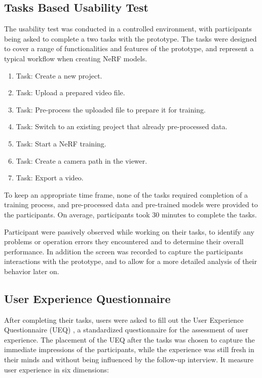 \subsection*{Tasks Based Usability Test}
\label{sec:methodology:study:tasks}

The usability test was conducted in a controlled environment, with participants being asked to complete a two tasks with the prototype.
The tasks were designed to cover a range of functionalities and features of the prototype, and represent a typical workflow when creating NeRF models.

\begin{enumerate}
  \item Task: Create a new project.
  \item Task: Upload a prepared video file.
  \item Task: Pre-process the uploaded file to prepare it for training.
  \item Task: Switch to an existing project that already pre-processed data.
  \item Task: Start a NeRF training.
  \item Task: Create a camera path in the viewer.
  \item Task: Export a video.
\end{enumerate}

To keep an appropriate time frame, none of the tasks required completion of a training process, and pre-processed data and pre-trained models were provided to the participants.
On average, participants took 30 minutes to complete the tasks.

Participant were passively observed while working on their tasks, to identify any problems or operation errors they encountered and to determine their overall performance.
In addition the screen was recorded to capture the participants interactions with the prototype, and to allow for a more detailed analysis of their behavior later on.

\subsection*{User Experience Questionnaire}
\label{sec:methodology:study:ueq}

After completing their tasks, users were asked to fill out the User Experience Questionnaire (UEQ) \cite{laugwitz_construction_2008}, a standardized questionnaire for the assessment of user experience.
The placement of the UEQ after the tasks was chosen to capture the immediate impressions of the participants, while the experience was still fresh in their minds and without being influenced by the follow-up interview.
It measure user experience in six dimensions:

